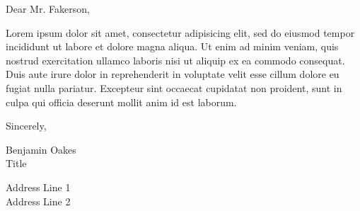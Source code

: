 \documentclass[12pt,letterpaper]{letter}
\begin{document}
Dear Mr. Fakerson,

Lorem ipsum dolor sit amet, consectetur adipisicing elit, sed do eiusmod tempor incididunt ut labore et dolore magna aliqua. Ut enim ad minim veniam, quis nostrud exercitation ullamco laboris nisi ut aliquip ex ea commodo consequat. Duis aute irure dolor in reprehenderit in voluptate velit esse cillum dolore eu fugiat nulla pariatur. Excepteur sint occaecat cupidatat non proident, sunt in culpa qui officia deserunt mollit anim id est laborum.

Sincerely,

Benjamin Oakes \\
Title

Address Line 1 \\
Address Line 2
\end{document}
